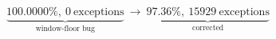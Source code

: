 \documentclass{article}
\begin{document}
\[
\underbrace{100.0000\%,\ 0\ \text{exceptions}}_{\text{window-floor bug}}\ \longrightarrow\ \underbrace{97.36\%,\ 15929\ \text{exceptions}}_{\text{corrected}}
\]
\end{document}
